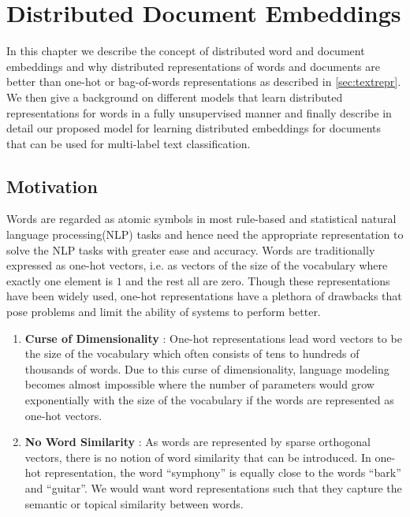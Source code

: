 \chapter{Distributed Document Embeddings}
\label{chapter:distembed}
In this chapter we describe the concept of distributed word and document embeddings and why distributed representations of words and documents are better than one-hot or bag-of-words representations as described in \ref{sec:textrepr}. We then give a background on different models that learn distributed representations for words in a fully unsupervised manner and finally describe in detail our proposed model for learning distributed embeddings for documents that can be used for multi-label text classification.

\section{Motivation}
\label{sec:motivation_distributed}


Words are regarded as atomic symbols in most rule-based and statistical natural language processing(NLP) tasks and hence need the appropriate representation to solve the NLP tasks with greater ease and accuracy. 
Words are traditionally expressed as one-hot vectors, i.e. as vectors of the size of the vocabulary where exactly one element is $1$ and the rest all are zero.
Though these representations have been widely used, one-hot representations have a plethora of drawbacks that pose problems and limit the ability of systems to perform better. 
\begin{enumerate}
\item \textbf{Curse of Dimensionality} : One-hot representations lead word vectors to be the size of the vocabulary which often consists of tens to hundreds of thousands of words. Due to this curse of dimensionality, language modeling becomes almost impossible where the number of parameters would grow exponentially with the size of the vocabulary if the words are represented as one-hot vectors.

\item \textbf{No Word Similarity} : As words are represented by sparse orthogonal vectors, there is no notion of word similarity that can be introduced. In one-hot representation, the word ``symphony'' is equally close to the words ``bark'' and ``guitar''. We would want word representations such that they capture the semantic or topical similarity between words.
\end{enumerate}

